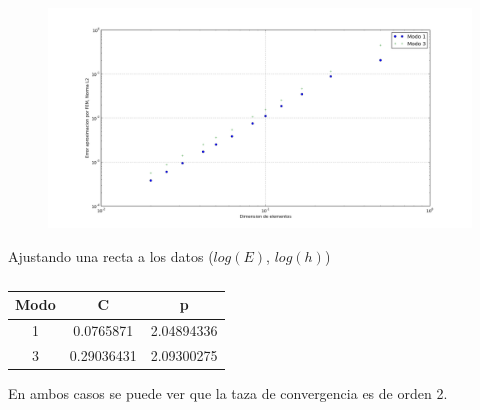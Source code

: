\begin{figure}
  \centering
  \includegraphics[width=17cm]{figuras/vectores_propiosFEM.png}
  \caption{   }
  \label{fig:vectores_propios}
\end{figure}

Ajustando una recta a los datos ($log(E)$, $log(h)$)
\begin{table}[h]
  \centering
  \begin{tabular}{|c|c|c|}
  \hline 
  Modo & C & p \\ 
  \hline 
  1 & 0.0765871 & 2.04894336 \\  
  \hline 
  3 & 0.29036431 & 2.09300275 \\  
  \hline 
  \end{tabular} 
  \caption{}
\end{table}

En ambos casos se puede ver que la taza de convergencia es de orden 2.

